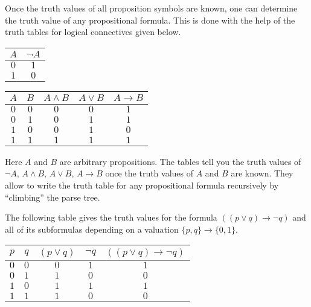 \begin{page}
\setcounter{section}{1}
\setcounter{subsection}{2}
\setcounter{dfn}{2}
\label{portion:412}


Once the truth values of all proposition symbols are known, one can determine the truth value of any propositional formula.
This is done with the help of the truth tables for logical connectives given below.

\begin{center}
\begin{tabular}{|c||c|}
\hline
$A$ & $\neg A$\\\hline
$0$ & $1$\\\hline
$1$ & $0$\\\hline
\end{tabular}
\hspace{2cm}
\begin{tabular}{|c|c||c|c|c|}
\hline
$A$ & $B$ & $A \wedge B$ & $A \vee B$ & $A \to B$\\\hline
$0$ & $0$ & $0$ & $0$ & $1$\\\hline
$0$ & $1$ & $0$ & $1$ & $1$\\\hline
$1$ & $0$ & $0$ & $1$ & $0$\\\hline
$1$ & $1$ & $1$ & $1$ & $1$\\\hline
\end{tabular}
\end{center}

Here $A$ and $B$ are arbitrary propositions.
The tables tell you the truth values of $\neg A$, $A \wedge B$, $A \vee B$, $A \to B$ once the truth values of $A$ and $B$ are known.
They allow to write the truth table for any propositional formula recursively by ``climbing'' the parse tree.


\end{page}

\begin{page}
\setcounter{section}{1}
\setcounter{subsection}{2}
\setcounter{dfn}{3}
\label{portion:414}

\begin{exl}
\label{exl:TruthTable}
The following table gives the truth values for the formula $((p \vee q) \to \neg q)$ and all of its subformulas
depending on a valuation $\{p, q\} \to \{0,1\}$.
\begin{center}
\begin{tabular}{|c|c|c|c|c|}
\hline
$p$ & $q$ & $(p \vee q)$ & $\neg q$ & $((p \vee q) \to \neg q)$\\\hline
$0$ & $0$ & $0$ & $1$ & $1$\\\hline
$0$ & $1$ & $1$ & $0$ & $0$\\\hline
$1$ & $0$ & $1$ & $1$ & $1$\\\hline
$1$ & $1$ & $1$ & $0$ & $0$\\\hline
\end{tabular}
\end{center}
\end{exl}

\end{page}

